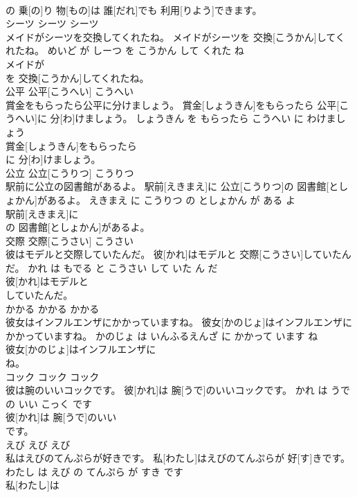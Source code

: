 \documentclass[8pt]{extreport}
\begin{document}
\begin{CJK}{UTF8}{min}
\\	の 乗[の]り 物[もの]は 誰[だれ]でも 利用[りよう]できます。			
\\	シーツ	シーツ	シーツ	
\\	メイドがシーツを交換してくれたね。	メイドがシーツを 交換[こうかん]してくれたね。	めいど が しーつ を こうかん して くれた ね	
\\	メイドが
\\	を 交換[こうかん]してくれたね。			
\\	公平	公平[こうへい]	こうへい	
\\	賞金をもらったら公平に分けましょう。	賞金[しょうきん]をもらったら 公平[こうへい]に 分[わ]けましょう。	しょうきん を もらったら こうへい に わけましょう	
\\	賞金[しょうきん]をもらったら
\\	に 分[わ]けましょう。			
\\	公立	公立[こうりつ]	こうりつ	
\\	駅前に公立の図書館があるよ。	駅前[えきまえ]に 公立[こうりつ]の 図書館[としょかん]があるよ。	えきまえ に こうりつ の としょかん が ある よ	
\\	駅前[えきまえ]に
\\	の 図書館[としょかん]があるよ。			
\\	交際	交際[こうさい]	こうさい	
\\	彼はモデルと交際していたんだ。	彼[かれ]はモデルと 交際[こうさい]していたんだ。	かれ は もでる と こうさい して いた ん だ	
\\	彼[かれ]はモデルと
\\	していたんだ。			
\\	かかる	かかる	かかる	
\\	彼女はインフルエンザにかかっていますね。	彼女[かのじょ]はインフルエンザにかかっていますね。	かのじょ は いんふるえんざ に かかって います ね	
\\	彼女[かのじょ]はインフルエンザに
\\	ね。			
\\	コック	コック	コック	
\\	彼は腕のいいコックです。	彼[かれ]は 腕[うで]のいいコックです。	かれ は うで の いい こっく です	
\\	彼[かれ]は 腕[うで]のいい
\\	です。			
\\	えび	えび	えび	
\\	私はえびのてんぷらが好きです。	私[わたし]はえびのてんぷらが 好[す]きです。	わたし は えび の てんぷら が すき です	
\\	私[わたし]は

\end{CJK}
\end{document}
